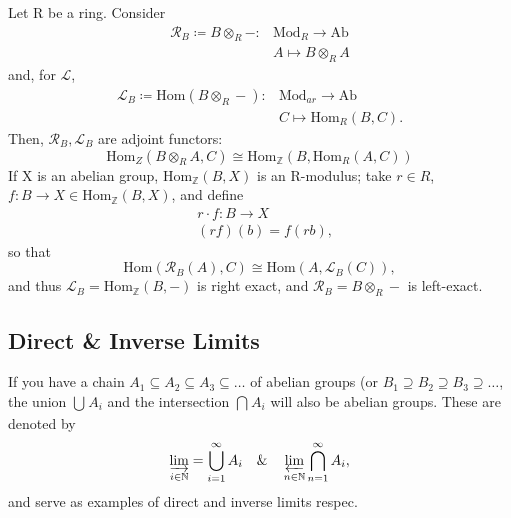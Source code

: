 \documentclass[../category_theory.tex]{subfiles}
\begin{document}
\begin{example}
	Let R be a ring. Consider
	\begin{align*}
		\mathcal{R}_{B}\coloneqq B \otimes_{R}-: & \mathrm{Mod}_{R}\rightarrow \mathrm{Ab} \\
		                                         & A\mapsto B\otimes_{R}A
	\end{align*}
	and, for \(\mathcal{L}\),
	\begin{align*}
		\mathcal{L}_{B}\coloneqq \mathrm{Hom}(B\otimes_{R}-): & \mathrm{Mod}_{ar}\rightarrow \mathrm{Ab} \\
		                                                      & C\mapsto \mathrm{Hom}_{R}(B, C).
	\end{align*}
	Then, \(\mathcal{R}_{B}, \mathcal{L}_{B}\) are adjoint functors:
	\[
		\mathrm{Hom}_{Z}(B\otimes_{R}A, C)\cong \mathrm{Hom}_{\mathbb{Z}}(B, \mathrm{Hom}_{R}(A, C))
	\]
	If X is an abelian group, \(\mathrm{Hom}_{\mathbb{Z}}(B, X)\) is an R-modulus; take \(r\in R\), \(f:B\rightarrow X\in \mathrm{Hom}_{\mathbb{Z}}(B, X)\), and define
	\begin{align*}
		 & r \cdot f:B\rightarrow X \\
		 & (rf)(b)=f(rb),
	\end{align*}
	so that
	\[
		\mathrm{Hom}(\mathcal{R}_{B}(A), C)\cong \mathrm{Hom}(A, \mathcal{L}_{B}(C)),
	\]
	and thus \(\mathcal{L}_{B}=\mathrm{Hom}_{\mathbb{Z}}(B, -)\) is right exact, and \(\mathcal{R}_{B}=B\otimes_{R}-\) is left-exact.
\end{example}
\subsection{Direct \& Inverse Limits}
If you have a chain \(A_{1}\subseteq A_{2}\subseteq A_{3}\subseteq \dotsc \) of abelian groups (or \(B_{1}\supseteq B_{2}\supseteq B_{3}\supseteq \dotsc \), the union \(\bigcup_{}^{}A_{i}\) and the intersection \(\bigcap_{}^{}A_{i}\) will also be abelian groups. These are denoted by
\[
	\varinjlim_{i\in \mathbb{N}}=\bigcup_{i=1}^{\infty}A_{i}\quad\&\quad \varprojlim_{n\in \mathbb{N}}\bigcap_{n=1}^{\infty}A_{i},
\]
and serve as examples of direct and inverse limits respec.
\end{document}
